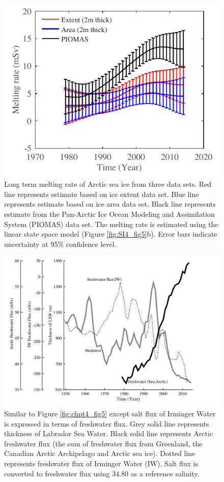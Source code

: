 \clearpage
\begin{figure}
	\centering
	\includegraphics{figs_app/FigS6.pdf}
	\caption[Long term melting rate of Arctic sea ice from three data sets.]{Long term melting rate of Arctic sea ice from three data sets.  Red line represents estimate based on ice extent data set.  Blue line represents estimate based on ice area data set. Black line represents estimate from the Pan-Arctic Ice Ocean Modeling and Assimilation System (PIOMAS) data set. The melting rate is estimated using the linear state space model (Figure \ref{fig:SI4_fig5}b).  Error bars indicate uncertainty at 95\% confidence level.}
	\label{fig:SI4_fig6}
\end{figure}

\clearpage
\begin{figure}
	\centering
	\includegraphics[width=120mm]{figs_app/FigS7.pdf}
	\caption[Similar to Figure \ref{fig:chpt4_fig5} except salt flux of Irminger Water is expressed in terms of freshwater flux.]{Similar to Figure \ref{fig:chpt4_fig5} except salt flux of Irminger Water is expressed in terms of freshwater flux.  Grey solid line represents thickness of Labrador Sea Water.  Black solid line represents Arctic freshwater flux (the sum of freshwater flux from Greenland, the Canadian Arctic Archipelago and Arctic sea ice).  Dotted line represents freshwater flux of Irminger Water (IW). Salt flux is converted to freshwater flux using 34.80 as a reference salinity.}
	\label{fig:SI4_fig7}
\end{figure}

